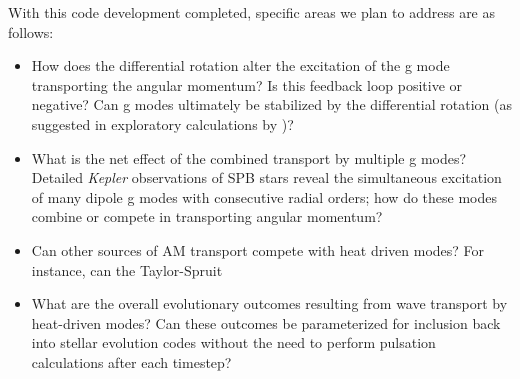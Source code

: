 

With this code development completed, specific areas we plan to address are as follows:
\begin{itemize}
\item How does the differential rotation alter the excitation of the g mode transporting the angular momentum? Is this feedback loop positive or negative? Can g modes ultimately be stabilized by the differential rotation (as suggested in exploratory calculations by \cite{Townsend:2008})?
\item What is the net effect of the combined transport by multiple g modes? Detailed \emph{Kepler} observations of SPB stars \citep[e.g., KIC 10526294][]{Papics:2014} reveal the simultaneous excitation of many dipole g modes with consecutive radial orders; how do these modes combine or compete in transporting angular momentum?
\item Can other sources of AM transport compete with heat driven modes? For instance, can the Taylor-Spruit 
\item What are the overall evolutionary outcomes resulting from wave transport by heat-driven modes? Can these outcomes be parameterized for inclusion back into stellar evolution codes without the need to perform pulsation calculations after each timestep?
\end{itemize}
